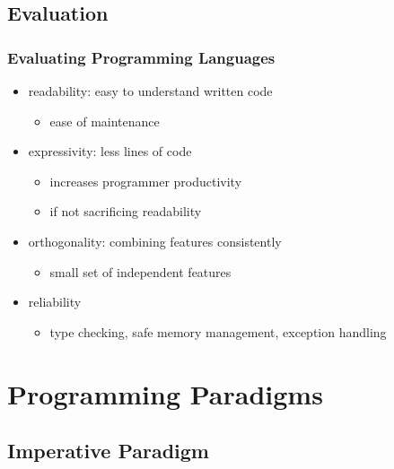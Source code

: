 \documentclass[dvipsnames]{beamer}
\theoremstyle{plain}
\begin{document}
\subsection{Evaluation}

\begin{frame}
  \frametitle{Evaluating Programming Languages}

  \begin{itemize}
    \item \alert{readability}: easy to understand written code
    \begin{itemize}
      \item ease of maintenance
    \end{itemize}

    \pause
    \medskip
    \item \alert{expressivity}: less lines of code
    \begin{itemize}
      \item increases programmer productivity
      \item if not sacrificing readability
    \end{itemize}

    \pause
    \medskip
    \item \alert{orthogonality}: combining features consistently
    \begin{itemize}
      \item small set of independent features
    \end{itemize}

    \pause
    \medskip
    \item \alert{reliability}
    \begin{itemize}
      \item type checking, safe memory management, exception handling
    \end{itemize}
  \end{itemize}
\end{frame}

\section{Programming Paradigms}

\subsection{Imperative Paradigm}
\end{document}
